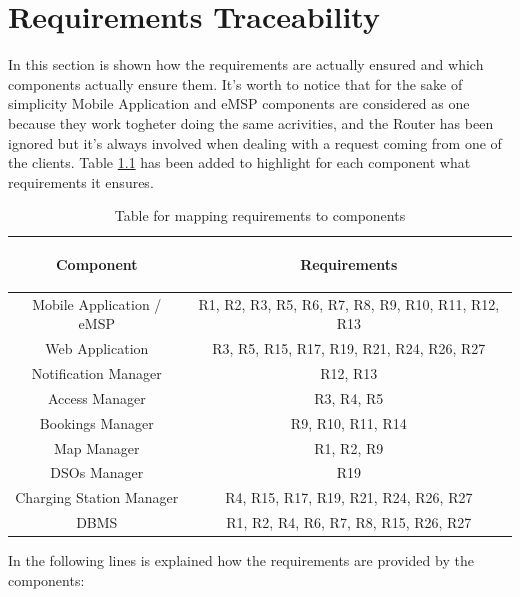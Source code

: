 \documentclass[a4paper]{report}
\begin{document}
\chapter{Requirements Traceability}
In this section is shown how the requirements are actually ensured and which components actually ensure them. It's worth to notice that for the sake of simplicity Mobile Application and eMSP components are considered as one because they work togheter doing the same acrivities, and the Router has been ignored  but it's always involved when dealing with a request coming from one of the clients.
Table \ref{tab:req-trace} has been added to highlight for each component what requirements it ensures.
\begin{table}[H]
  \centering
  \begin{tabular}{|c|c|}
    \cline{1-2}
   	\rule{0pt}{10pt}
   	\begin{large}
    \textbf{Component}
    \end{large}&\begin{large}
    \textbf{Requirements}
    \end{large}\\  \hline
    Mobile Application / eMSP &  R1, R2, R3, R5, R6, R7, R8, R9, R10, R11, R12, R13\\ \hline
    Web Application &  R3, R5, R15, R17, R19, R21, R24, R26, R27 \\ \hline
    Notification Manager &  R12, R13\\ \hline
    Access Manager & R3, R4, R5\\ \hline
    Bookings Manager & R9, R10, R11, R14\\ \hline
    Map Manager & R1, R2, R9 \\ \hline
    DSOs Manager &  R19\\ \hline
    Charging Station Manager & R4, R15, R17, R19, R21, R24, R26, R27 \\ \hline
    DBMS & R1, R2, R4, R6, R7, R8, R15, R26, R27 \\ \hline

  \end{tabular}
\caption{Table for mapping requirements to components} \label{tab:req-trace}
\end{table}
In the following lines is explained how the requirements are provided by the components:
\end{document}

